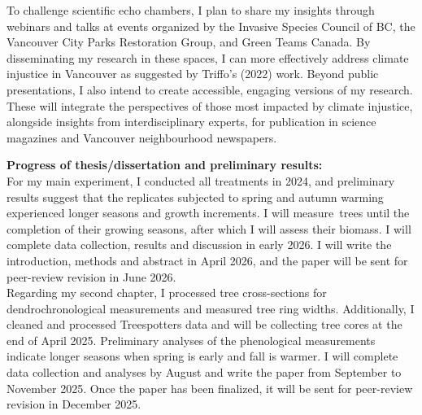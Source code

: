 \documentclass[11pt,letter]{article}
\begin{document}
To challenge scientific echo chambers, I plan to share my insights through webinars and talks at events organized by the Invasive Species Council of BC, the Vancouver City Parks Restoration Group, and Green Teams Canada. By disseminating my research in these spaces, I can more effectively address climate injustice in Vancouver as suggested by Triffo’s (2022) work.  \citep{triffo_green_2022} Beyond public presentations, I also intend to create accessible, engaging versions of my research. These will integrate the perspectives of those most impacted by climate injustice, alongside insights from interdisciplinary experts, for publication in science magazines and Vancouver neighbourhood newspapers.
\par
\textbf{Progress of thesis/dissertation and preliminary results:}\\ 
For my main experiment, I conducted all treatments in 2024, and preliminary results suggest that the replicates subjected to spring and autumn warming experienced longer seasons and growth increments. I will measure trees until the completion of their growing seasons, after which I will assess their biomass. I will complete data collection, results and discussion in early 2026. I will write the introduction, methods and abstract in April  2026, and the paper will be sent for peer-review revision in June 2026.
\\
Regarding my second chapter, I processed tree cross-sections for dendrochronological measurements and measured tree ring widths. Additionally, I cleaned and processed Treespotters data and will be collecting tree cores at the end of April 2025. Preliminary analyses of the phenological measurements indicate longer seasons when spring is early and fall is warmer. I will complete data collection and analyses by August and write the paper from September to November 2025. Once the paper has been finalized, it will be sent for peer-review revision in December 2025.
\end{document}
